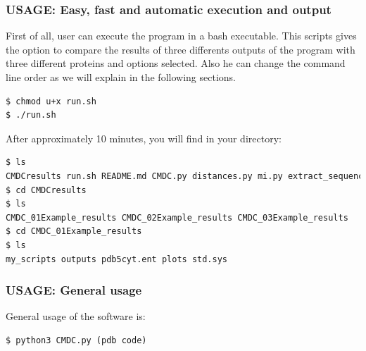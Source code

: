 \documentclass[12pt]{article}
\begin{document}
\subsubsection{USAGE: Easy, fast and automatic execution and output}
First of all, user can execute the program in a bash executable. This scripts gives the option to compare the results of three differents outputs of the program with three different proteins and options selected. Also he can change the command line order as we will explain in the following sections.

\begin{lstlisting}[language=bash]
$ chmod u+x run.sh
$ ./run.sh
\end{lstlisting}
After approximately 10 minutes, you will find in your directory:
\begin{lstlisting}[language=bash]
$ ls
CMDCresults run.sh README.md CMDC.py distances.py mi.py extract_sequences.py 
$ cd CMDCresults
$ ls
CMDC_01Example_results CMDC_02Example_results CMDC_03Example_results 
$ cd CMDC_01Example_results
$ ls
my_scripts outputs pdb5cyt.ent plots std.sys
\end{lstlisting}
	

\subsubsection{USAGE: General usage}
General usage of the software is:
\begin{lstlisting}[language=python]
$ python3 CMDC.py (pdb code)
\end{lstlisting}
\end{document}
